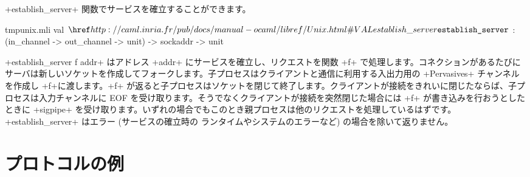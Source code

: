 \ml+establish_server+ 関数でサービスを確立することができます。
%
\begin{listingcodefile}{tmpunix.mli}
val $\indexlibvalue{Unix}{establish\_server}$ :
  (in_channel -> out_channel -> unit) -> sockaddr -> unit
\end{listingcodefile}
%
\ml+establish_server f addr+ はアドレス \ml+addr+ にサービスを確立し、リクエストを関数 \ml+f+ で処理します。コネクションがあるたびにサーバは新しいソケットを作成してフォークします。子プロセスはクライアントと通信に利用する入出力用の \ml+Pervasives+ チャンネルを作成し \ml+f+に渡します。\ml+f+ が返ると子プロセスはソケットを閉じて終了します。クライアントが接続をきれいに閉じたならば、子プロセスは入力チャンネルに EOF を受け取ります。そうでなくクライアントが接続を突然閉じた場合には \ml+f+ が書き込みを行おうとしたときに \ml+sigpipe+ を受け取ります。いずれの場合でもこのとき親プロセスは他のリクエストを処理しているはずです。\ml+establish_server+ はエラー (サービスの確立時の \ocaml ランタイムやシステムのエラーなど) の場合を除いて返りません。


\section{プロトコルの例}

